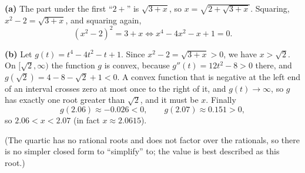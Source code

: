 \textbf{(a)} The part under the first ``$2+$'' is $\sqrt{3+x}$, so $x=\sqrt{2+\sqrt{3+x}}$. Squaring, $x^2-2=\sqrt{3+x}$, and squaring again,
\[
\left(x^2-2\right)^2=3+x\iff\boxed{x^4-4x^2-x+1=0}.
\]

\textbf{(b)} Let $g(t)=t^4-4t^2-t+1$. Since $x^2-2=\sqrt{3+x}>0$, we have $x>\sqrt2$. On $[\sqrt2,\infty)$ the function $g$ is convex, because $g''(t)=12t^2-8>0$ there, and $g(\sqrt2)=4-8-\sqrt2+1<0$. A convex function that is negative at the left end of an interval crosses zero at most once to the right of it, and $g(t)\to\infty$, so $g$ has exactly one root greater than $\sqrt2$, and it must be $x$. Finally
\[
g(2.06)\approx-0.026<0,\qquad g(2.07)\approx0.151>0,
\]
so $\boxed{2.06<x<2.07}$ (in fact $x\approx2.0615$).

(The quartic has no rational roots and does not factor over the rationals, so there is no simpler closed form to ``simplify'' to; the value is best described as this root.)
